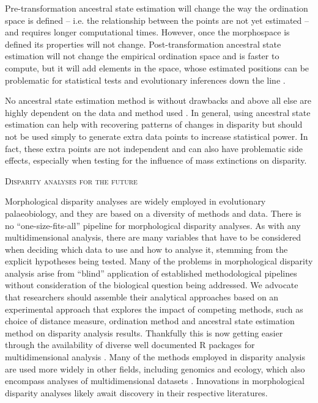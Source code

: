 \documentclass[12pt,letterpaper]{article}
\renewcommand{\section}[1]{%
\bigskip
\begin{center}
\begin{Large}
\normalfont\scshape #1
\medskip
\end{Large}
\end{center}}
\begin{document}
Pre-transformation ancestral state estimation will change the way the ordination space is defined -- i.e. the relationship between the points are not yet estimated -- and requires longer computational times.
However, once the morphospace is defined its properties will not change.
Post-transformation ancestral state estimation will not change the empirical ordination space and is faster to compute, but it will add elements in the space, whose estimated positions can be problematic for statistical tests and evolutionary inferences down the line \citep{lloyd2018}.

No ancestral state estimation method is without drawbacks and above all else are highly dependent on the data and method used \cite{Louca2019}.
In general, using ancestral state estimation can help with recovering patterns of changes in disparity but should not be used simply to generate extra data points to increase statistical power.
In fact, these extra points are not independent and can also have problematic side effects, especially when testing for the influence of mass extinctions on disparity.

\section{Disparity analyses for the future}
\label{section:future}

\noindent Morphological disparity analyses are widely employed in evolutionary palaeobiology, and they are based on a diversity of methods and data.
There is no ``one-size-fits-all'' pipeline for morphological disparity analyses.
As with any multidimensional analysis, there are many variables that have to be considered when deciding which data to use and how to analyse it, stemming from the explicit hypotheses being tested.
Many of the problems in morphological disparity analysis arise from ``blind'' application of established methodological pipelines without consideration of the biological question being addressed.
We advocate that researchers should assemble their analytical approaches based on an experimental approach that explores the impact of competing methods, such as choice of distance measure, ordination method and ancestral state estimation method on disparity analysis results.
Thankfully this is now getting easier through the availability of diverse well documented R packages for multidimensional analysis \citep{Navarro2003-vz, Bouxin2005-wk, oksanen2007vegan, Harmon2008-gq, lloyd2016, Guillerme2018-uc}.
Many of the methods employed in disparity analysis are used more widely in other fields, including genomics and ecology, which also encompass analyses of multidimensional datasets \citep{Donohue2013-bg, Saupe2015-vm, Canter2018-hk, mammola2019}.
Innovations in morphological disparity analyses likely await discovery in their respective literatures.
\end{document}
